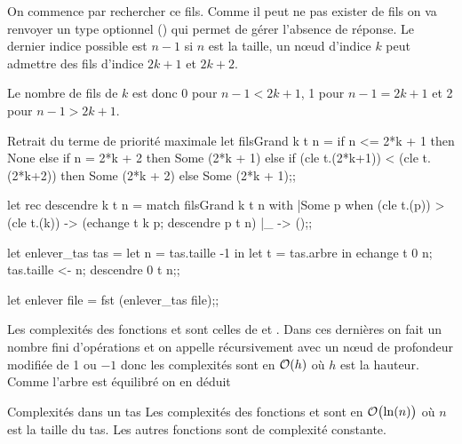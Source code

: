 On commence par rechercher ce fils. Comme il peut ne pas exister de fils on va renvoyer un type optionnel () qui permet de gérer l'absence de réponse. Le dernier indice possible est $n-1$ si $n$ est la taille, un nœud d'indice $k$ peut admettre des fils d'indice $2k+1$ et $2k+2$.

Le nombre de fils de $k$ est donc 0 pour $n-1 < 2k+1$, 1 pour $n-1=2k+1$ et 2 pour $n-1 > 2k+1$.
\begin{code}{Retrait du terme de priorité maximale}
let filsGrand k t n =
   if n <= 2*k + 1 
   then None
   else if n = 2*k + 2  
        then Some (2*k + 1)
        else if (cle t.(2*k+1)) < (cle t.(2*k+2))
             then Some (2*k + 2) else Some (2*k + 1);;  

let rec descendre k t n =
   match filsGrand k t n with
   |Some p when (cle t.(p)) > (cle t.(k))
       -> (echange t k p; descendre p t n)
   |_ -> ();;

let enlever_tas tas =
   let n  = tas.taille -1 in
   let t  = tas.arbre in
   echange t 0 n;
   tas.taille <- n;
   descendre 0 t n;;
  
let enlever file = fst (enlever_tas file);;
\end{code}


Les complexités des fonctions  et  sont celles de   et . Dans ces dernières on fait un nombre fini d'opérations et on appelle récursivement avec un nœud de profondeur modifiée de 1 ou $-1$ donc les complexités sont en ${\cal O}(h)$ où $h$ est la hauteur. Comme l'arbre est équilibré on en déduit
\begin{thm}{Complexités dans un tas}{}
Les complexités des fonctions  et  sont en ${\cal O}\bigl(\ln(n)\bigr)$ où $n$ est la taille du tas. Les autres fonctions sont de complexité constante.
\end{thm}
